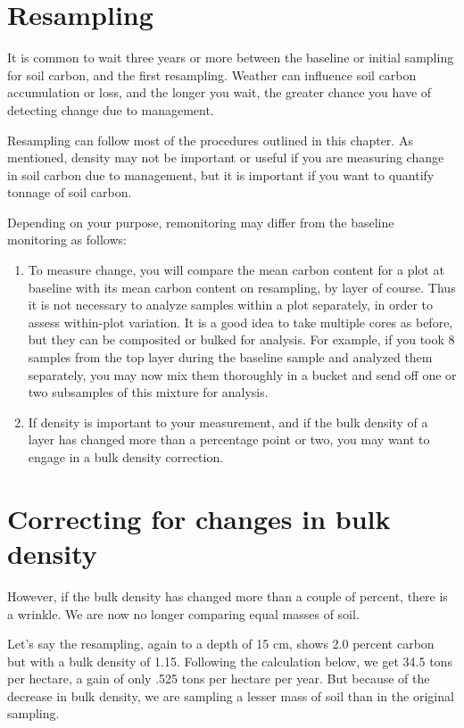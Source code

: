 \documentclass[11pt,letterpaper,oneside,onecolumn]{memoir}
\begin{document}
\section{Resampling}

It is common to wait three years or more between the baseline or initial sampling for soil carbon, and the first resampling. Weather can influence soil carbon accumulation or loss, and the longer you wait, the greater chance you have of detecting change due to management.

Resampling can follow most of the procedures outlined in this chapter. As mentioned, density may not be important or useful if you are measuring change in soil carbon due to management, but it is important if you want to quantify tonnage of soil carbon.

Depending on your purpose, remonitoring may differ from the baseline monitoring as follows:

\begin{enumerate}
\item To measure change, you will compare the mean carbon content for a plot at baseline with its mean carbon content on resampling, by layer of course. Thus it is not necessary to analyze samples within a plot separately, in order to assess within-plot variation. It is a good idea to take multiple cores as before, but they can be composited or bulked for analysis. For example, if you took 8 samples from the top layer during the baseline sample and analyzed them separately, you may now mix them thoroughly in a bucket and send off one or two subsamples of this mixture for analysis.

\item If density is important to your measurement, and if the bulk density of a layer has changed more than a percentage point or two, you may want to engage in a bulk density correction.

\end{enumerate}

\section{Correcting for changes in bulk density}

However, if the bulk density has changed\label{bd correx} more than a couple of percent, there is a wrinkle. We are now no longer comparing equal masses of soil.

Let's say the resampling, again to a depth of 15 cm, shows 2.0 percent carbon but with a bulk density of 1.15. Following the calculation below, we get 34.5 tons per hectare, a gain of only .525 tons per hectare per year. But because of the decrease in bulk density, we are sampling a lesser mass of soil than in the original sampling.
\end{document}
